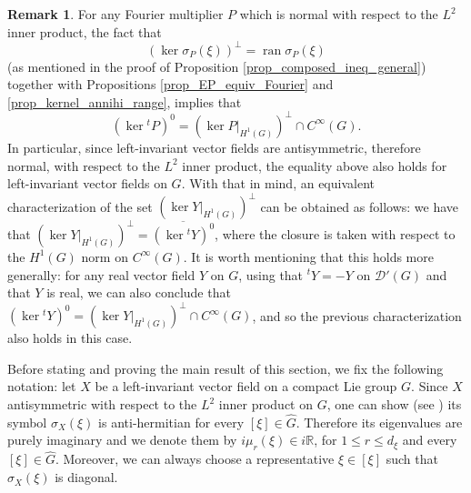 \documentclass[11pt]{amsart}
\numberwithin{theorem}{section}
\numberwithin{equation}{section}
\theoremstyle{definition}
\numberwithin{example}{section}
\theoremstyle{definition}
\newtheorem{obs}{Remark}
\theoremstyle{definition}
\newcommand{\R}{\mathbb{R}}
\begin{document}
\begin{obs}\label{remark_normal_ran_ker}
For any Fourier multiplier $P$ which is normal with respect to the $L^2$ inner product, the fact that 
    \begin{equation*}
        (\ker \sigma_P(\xi))^\perp=\operatorname{ran}\sigma_P(\xi)
    \end{equation*}
    (as mentioned in the proof of Proposition \ref{prop_composed_ineq_general}) together with  Propositions \ref{prop_EP_equiv_Fourier} and  \ref{prop_kernel_annihi_range}, implies that
    \begin{equation*}
        (\ker {}^tP)^0=(\ker P|_{H^1(G)})^\perp\cap C^\infty(G).
    \end{equation*}
    In particular, since left-invariant vector fields are antisymmetric, therefore normal, with respect to the $L^2$ inner product, the equality above also holds for left-invariant vector fields on $G$. With that in mind, an  equivalent characterization of the set $(\ker Y|_{H^1(G)})^\perp$  can be obtained as follows: we have that $(\ker Y|_{H^1(G)})^\perp=\overline{(\ker {}^tY)^0}$, where the closure is taken with respect to the $H^1(G)$ norm on $C^\infty(G)$. It is worth mentioning that this holds more generally: for any real vector field $Y$ on $G$, using that ${}^tY=-Y$ on $\mathcal{D}'(G)$ and that $Y$ is real, we can also conclude that  $(\ker {}^tY)^0=(\ker Y|_{H^1(G)})^\perp\cap C^\infty(G)$, and so the previous characterization also holds in this case. 
\end{obs}

Before stating and proving the main result of this section, we fix the following notation: let $X$ be a left-invariant vector field on a compact Lie group $G$. Since $X$ antisymmetric with respect to the $L^2$ inner product on $G$, 
 one can show (see \cite[Remark 10.4.20]{RT2010_book})  its symbol $\sigma_X(\xi)$  is anti-hermitian for every $[\xi]\in\widehat{G}$. Therefore its eigenvalues are purely imaginary and we denote them by $i\mu_r(\xi)\in i\R$, for  $1\leq r\leq d_\xi$ and every $[\xi]\in\widehat{G}$. Moreover, we can always choose a representative $\xi\in [\xi]$ such that $\sigma_X(\xi)$ is diagonal.
\end{document}
